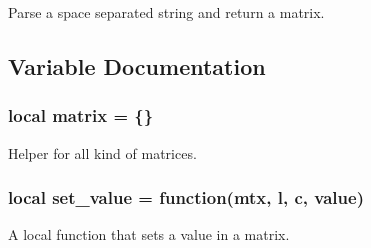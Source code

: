 Parse a space separated string and return a matrix. 



\subsection{Variable Documentation}
\hypertarget{matrix_8lua_af18b890fa1eb240e9244c2d4d742a110}{
\subsubsection[{matrix}]{\setlength{\rightskip}{0pt plus 5cm}local matrix = \{\}}}\label{matrix_8lua_af18b890fa1eb240e9244c2d4d742a110}


Helper for all kind of matrices. 

\hypertarget{matrix_8lua_a66c1d1ca9853fe7142b09707397e5ac2}{
\subsubsection[{set\-\_\-value}]{\setlength{\rightskip}{0pt plus 5cm}local set\-\_\-value = function(mtx, l, c, value)}}\label{matrix_8lua_a66c1d1ca9853fe7142b09707397e5ac2}


A local function that sets a value in a matrix. 

